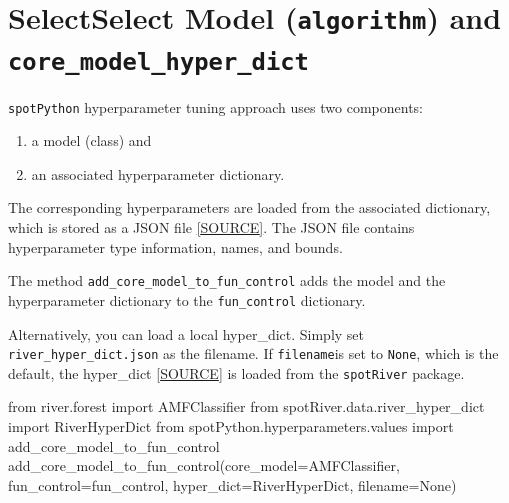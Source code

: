 \documentclass[
  letterpaper,
  DIV=11,
  numbers=noendperiod]{scrreprt}
\newenvironment{Shaded}{\begin{snugshade}}{\end{snugshade}}
\newcommand{\ImportTok}[1]{\textcolor[rgb]{0.00,0.46,0.62}{#1}}
\newcommand{\NormalTok}[1]{\textcolor[rgb]{0.00,0.23,0.31}{#1}}
\newcommand{\OperatorTok}[1]{\textcolor[rgb]{0.37,0.37,0.37}{#1}}
\newcommand{\VariableTok}[1]{\textcolor[rgb]{0.07,0.07,0.07}{#1}}
\providecommand{\tightlist}{%
  \setlength{\itemsep}{0pt}\setlength{\parskip}{0pt}}\usepackage{longtable,booktabs,array}
\begin{document}
\hypertarget{selectselect-model-algorithm-and-core_model_hyper_dict-2}{%
\section{\texorpdfstring{SelectSelect Model (\texttt{algorithm}) and
\texttt{core\_model\_hyper\_dict}}{SelectSelect Model (algorithm) and core\_model\_hyper\_dict}}\label{selectselect-model-algorithm-and-core_model_hyper_dict-2}}

\texttt{spotPython} hyperparameter tuning approach uses two components:

\begin{enumerate}
\def\labelenumi{\arabic{enumi}.}
\tightlist
\item
  a model (class) and
\item
  an associated hyperparameter dictionary.
\end{enumerate}

The corresponding hyperparameters are loaded from the associated
dictionary, which is stored as a JSON file
\href{https://github.com/sequential-parameter-optimization/spotRiver/blob/main/src/spotRiver/data/river_hyper_dict.json}{{[}SOURCE{]}}.
The JSON file contains hyperparameter type information, names, and
bounds.

The method \texttt{add\_core\_model\_to\_fun\_control} adds the model
and the hyperparameter dictionary to the \texttt{fun\_control}
dictionary.

Alternatively, you can load a local hyper\_dict. Simply set
\texttt{river\_hyper\_dict.json} as the filename. If \texttt{filename}is
set to \texttt{None}, which is the default, the hyper\_dict
\href{https://github.com/sequential-parameter-optimization/spotRiver/blob/main/src/spotRiver/data/river_hyper_dict.json}{{[}SOURCE{]}}
is loaded from the \texttt{spotRiver} package.

\begin{Shaded}
\begin{Highlighting}[]
\ImportTok{from}\NormalTok{ river.forest }\ImportTok{import}\NormalTok{ AMFClassifier}
\ImportTok{from}\NormalTok{ spotRiver.data.river\_hyper\_dict }\ImportTok{import}\NormalTok{ RiverHyperDict}
\ImportTok{from}\NormalTok{ spotPython.hyperparameters.values }\ImportTok{import}\NormalTok{ add\_core\_model\_to\_fun\_control}
\NormalTok{add\_core\_model\_to\_fun\_control(core\_model}\OperatorTok{=}\NormalTok{AMFClassifier,}
\NormalTok{                              fun\_control}\OperatorTok{=}\NormalTok{fun\_control,}
\NormalTok{                              hyper\_dict}\OperatorTok{=}\NormalTok{RiverHyperDict,}
\NormalTok{                              filename}\OperatorTok{=}\VariableTok{None}\NormalTok{)}
\end{Highlighting}
\end{Shaded}
\end{document}
